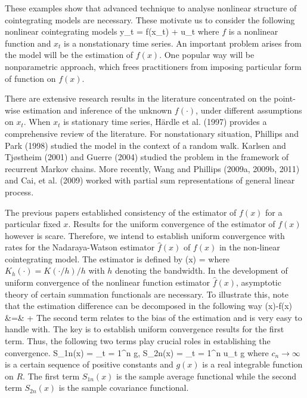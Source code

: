 These examples show that advanced technique to analyse nonlinear structure of cointegrating models are necessary. These motivate us to consider the following nonlinear cointegrating models
\be
y_t = f(x_t) + u_t
\ee
where $f$ is a nonlinear function and $x_t$ is a nonstationary time series. An important problem arises from the model will be the estimation of $f(x)$. One popular way will be nonparametric approach, which frees practitioners from imposing particular form of function on $f(x)$. 

There are extensive research results in the literature concentrated on the point-wise estimation and inference of the unknown $f(\cdot)$, under different assumptions on $x_t$. When $x_t$ is stationary time series, H\"{a}rdle et al. (1997) provides a comprehensive review of the literature. For nonstationary situation, Phillips and Park (1998) studied the model in the context of a random walk. Karlsen and Tj\o stheim (2001) and Guerre (2004) studied the problem in the framework of recurrent Markov chains. More recently,  Wang and Phillips (2009a, 2009b, 2011) and Cai, et al. (2009) worked with partial sum representations of general linear process.
 
The previous papers established consistency of the estimator of $f(x)$ for a particular fixed $x$. Results for the uniform convergence of the estimator of $f(x)$ however is scare. Therefore, we intend to establish uniform convergence with rates for the Nadaraya-Watson estimator $\hat{f}(x)$ of $f(x)$ in the non-linear cointegrating model. The estimator is defined by
\be
  (x) = 
\ee
where $K_h(\cdot) = K(\cdot / h)/h$ with $h$ denoting the bandwidth. In the development of uniform convergence of the nonlinear function estimator $\hat{f}(x)$, asymptotic theory of certain summation functionals are necessary. To illustrate this, note that the estimation difference can be decomposed in the following way
\bestar
	(x)-f(x) &=& +
\eestar
The second term relates to the bias of the estimation and is very easy to handle with. The key is to establish uniform convergence results for the first term. Thus, the following two terms play crucial roles in establishing the convergence.
\be
  S_{1n}(x) = \sum_{t = 1}^n g\big [c_n(x_t - x) \big], \qquad S_{2n}(x) = \sum_{t = 1}^n u_t g\big [c_n(x_t - x) \big]
\ee
where $c_n\to \infty$ is a certain sequence of positive constants and $g(x)$ is a real integrable function on $R$. The first term $S_{1n}(x)$ is the sample average functional while the second term $S_{2n}(x)$ is the sample covariance functional.

